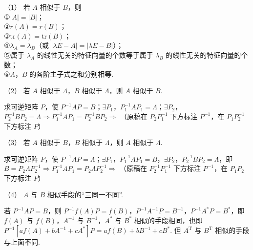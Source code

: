 
\begin{fcard}{（1）}
若 $A$ 相似于 $B$，则\\
①$|A|=|B|$；\\
②$r(A)=r(B)$；\\
③$\mathrm{tr}(A)=\mathrm{tr}(B)$；\\
④$\lambda_A=\lambda_B$（或 $|\lambda E-A|=|\lambda E-B|$）；\\
⑤属于 $\lambda_A$ 的线性无关的特征向量的个数等于属于 $\lambda_B$ 的线性无关的特征向量的个数；\\
⑥$A$，$B$ 的各阶主子式之和分别相等.
\end{fcard}

\begin{fcard}{（2）}
若 $A$ 相似于 $\Lambda$，$B$ 相似于 $\Lambda$，则 $A$ 相似于 $B$.

求可逆矩阵 $P$，使 $P^{-1}AP=B$；$\exists P_1$，$P_1^{-1}AP_1=\Lambda$；$\exists P_2$，$P_2^{-1}BP_2=\Lambda\Rightarrow P_1^{-1}AP_1=P_2^{-1}BP_2\Rightarrow$
（原稿在 $P_2P_1^{-1}$ 下方标注 $P^{-1}$，在 $P_1P_2^{-1}$ 下方标注 $P$）
\end{fcard}

\begin{fcard}{（3）}
若 $A$ 相似于 $B$，$B$ 相似于 $\Lambda$，则 $A$ 相似于 $\Lambda$.

求可逆矩阵 $P$，使 $P^{-1}AP=\Lambda$；$\exists P_1$，$P_1^{-1}AP_1=B$，$\exists P_2$，$P_2^{-1}BP_2=\Lambda$，即 $B=P_2\Lambda P_2^{-1}\Rightarrow P_1^{-1}AP_1=P_2\Lambda P_2^{-1}\Rightarrow$
（原稿在 $P_2^{-1}P_1^{-1}$ 下方标注 $P^{-1}$，在 $P_1P_2$ 下方标注 $P$）
\end{fcard}

\begin{fcard}{（4）}
$A$ 与 $B$ 相似手段的“三同一不同”.

若 $P^{-1}AP=B$，则 $P^{-1}f(A)P=f(B)$，$P^{-1}A^{-1}P=B^{-1}$，$P^{-1}A^{*}P=B^{*}$，即 $f(A)$ 与 $f(B)$，$A^{-1}$ 与 $B^{-1}$，$A^{*}$ 与 $B^{*}$ 相似的手段相同，也即 $P^{-1}[af(A)+bA^{-1}+cA^{*}]P=af(B)+bB^{-1}+cB^{*}$. 但 $A^{\mathrm T}$ 与 $B^{\mathrm T}$ 相似的手段与上面不同.
\end{fcard}

